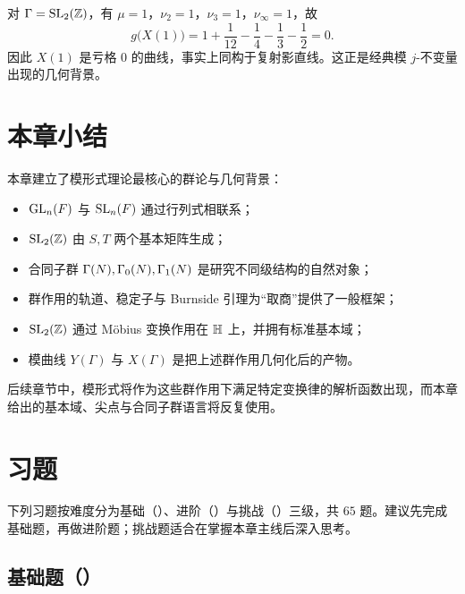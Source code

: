 \begin{example}
对 $\Gamma=\mathrm{SL}_2(\mathbb{Z})$，有 $\mu=1$，$\nu_2=1$，$\nu_3=1$，$\nu_{\infty}=1$，故
\[
g\bigl(X(1)\bigr)=1+\frac1{12}-\frac14-\frac13-\frac12=0.
\]
因此 $X(1)$ 是亏格 $0$ 的曲线，事实上同构于复射影直线。这正是经典模 $j$-不变量出现的几何背景。
\end{example}

\section*{本章小结}

本章建立了模形式理论最核心的群论与几何背景：
\begin{itemize}
  \item $\mathrm{GL}_n(F)$ 与 $\mathrm{SL}_n(F)$ 通过行列式相联系；
  \item $\mathrm{SL}_2(\mathbb{Z})$ 由 $S,T$ 两个基本矩阵生成；
  \item 合同子群 $\Gamma(N),\Gamma_0(N),\Gamma_1(N)$ 是研究不同级结构的自然对象；
  \item 群作用的轨道、稳定子与 Burnside 引理为“取商”提供了一般框架；
  \item $\mathrm{SL}_2(\mathbb{Z})$ 通过 Möbius 变换作用在 $\mathbb{H}$ 上，并拥有标准基本域；
  \item 模曲线 $Y(\Gamma)$ 与 $X(\Gamma)$ 是把上述群作用几何化后的产物。
\end{itemize}
后续章节中，模形式将作为这些群作用下满足特定变换律的解析函数出现，而本章给出的基本域、尖点与合同子群语言将反复使用。

\section*{习题}

下列习题按难度分为基础（\basic）、进阶（\medium）与挑战（\hard）三级，共 $65$ 题。建议先完成基础题，再做进阶题；挑战题适合在掌握本章主线后深入思考。

\subsection*{基础题（\basic）}

